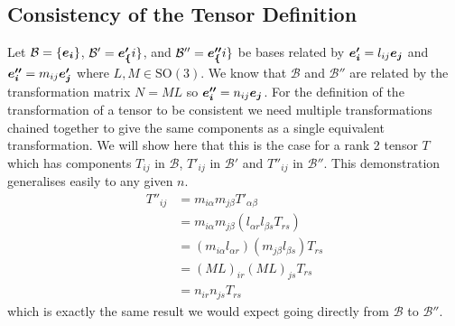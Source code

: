 \documentclass[a4paper]{article}
\newcommand{\specialOrthogonalGroup}{\mathrm{SO}}
\newcommand{\basis}{\mathcal{B}}
\newcommand{\veprime}[1]{\vv{e'_{#1}}}
\newcommand{\vepprime}[1]{\vv{e''_{#1}}}
\begin{document}
    \subsection{Consistency of the Tensor Definition}
    Let \(\basis = \{\ve{i}\}\), \(\basis' = {\veprime\{i\}}\), and \(\basis'' = \vepprime\{i\}\) be bases related by \(\veprime{i} = l_{ij}\ve{j}\) and \(\vepprime{i} = m_{ij}\veprime{j}\) where \(L, M\in\specialOrthogonalGroup(3)\).
    We know that \(\basis\) and \(\basis''\) are related by the transformation matrix \(N = ML\) so \(\vepprime{i} = n_{ij}\ve{j}\).
    For the definition of the transformation of a tensor to be consistent we need multiple transformations chained together to give the same components as a single equivalent transformation.
    We will show here that this is the case for a rank 2 tensor \(T\) which has components \(T_{ij}\) in \(\basis\), \(T'_{ij}\) in \(\basis'\) and \(T''_{ij}\) in \(\basis''\).
    This demonstration generalises easily to any given \(n\).
    \begin{align*}
        T''_{ij} &= m_{i\alpha} m_{j\beta} T'_{\alpha\beta}\\
        &= m_{i\alpha}m_{j\beta} (l_{\alpha r}l_{\beta s}T_{rs})\\
        &= (m_{i\alpha}l_{\alpha r})(m_{j\beta}l_{\beta s}) T_{rs}\\
        &= (ML)_{ir}(ML)_{js} T_{rs}\\
        &= n_{ir}n_{js}T_{rs}
    \end{align*}
    which is exactly the same result we would expect going directly from \(\basis\) to \(\basis''\).
    
\end{document}
